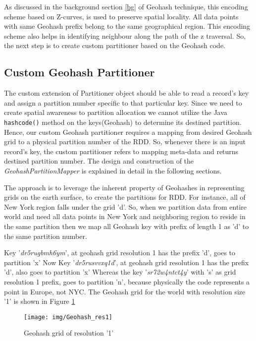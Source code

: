 \documentclass[article,type=msc,colorback,12pt,accentcolor=tud1d]{tudthesis}
\begin{document}
				As discussed in the background section \ref{bg} of Geohash technique, this encoding scheme based on Z-curves, is used to preserve spatial locality. All data points with same Geohash prefix belong to the same geographical region. This encoding scheme also helps in identifying neighbour along the path of the z traversal. So, the next step is to create custom partitioner based on the Geohash code.

		
		\subsection{Custom Geohash Partitioner}
				
		\par The custom extension of Partitioner object should be able to read a record's key and assign a partition number specific to that particular key. Since we need to create spatial awareness to partition allocation we cannot utilize the Java \texttt{hashcode()} method on the keys(Geohash) to determine its destined partition. Hence, our custom Geohash partitioner requires a mapping from desired Geohash grid to a physical partition number of the RDD. So, whenever there is an input record's key, the custom partitioner refers to mapping meta-data and returns destined partition number. The design and construction of the \textit{GeohashPartitionMapper} is explained in detail in the following sections.
		
		The approach is to leverage the inherent property of Geohashes in representing grids on the earth surface, to create the partitions for RDD. For instance, all of New York region falls under the grid 'd'. So, when we partition data from entire world and need all data points in New York and neighboring region to reside in the same partition then we map all Geohash key with prefix of length 1 as 'd' to the same partition number.  
		
		Key '\textit{dr5rugbmh6ym}', at geohash grid resolution 1 has the prefix 'd', goes to partition 'x'
		Now Key '\textit{dr5rusvvxq1d}', at geohash grid resolution 1 has the prefix 'd', also goes to partition 'x'
		Whereas the key '\textit{sr72w4ntct4y}' with 's' as grid resolution 1 prefix, goes to partition 'n', because physically the code represents a point in Europe, not NYC. The Geohash grid for the world with resolution size '1' is shown in Figure \ref{fig:Geohash_res1}
							
			\begin{figure}[h]
			\centering
			\texttt{[image: img/Geohash\_res1]}
			\caption{Geohash grid of resolution '1'}
			\label{fig:Geohash_res1}
			\end{figure}
		
\end{document}
